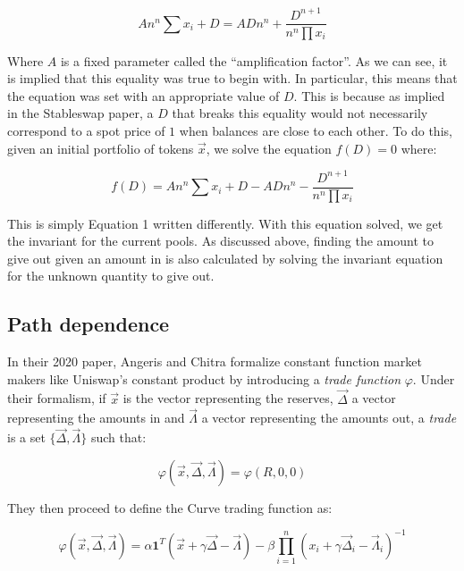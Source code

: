 \documentclass{article}
\begin{document}
    \begin{equation}
        A n^{n} \sum x_{i}+D=A D n^{n}+\frac{D^{n+1}}{n^{n} \prod x_{i}}
    \end{equation}

    Where $A$ is a fixed parameter called the ``amplification factor''. As we can see, it is implied that this equality was true to begin with. In particular, this means that the equation was set with an appropriate value of $D$. This is because as implied in the Stableswap paper, a $D$ that breaks this equality would not necessarily correspond to a spot price of $1$ when balances are close to each other. To do this, given an initial portfolio of tokens $\vec{x}$, we solve the equation $f(D) = 0$ where: 

    \begin{equation}
        f(D) = A n^{n} \sum x_{i}+D - A D n^{n} -\frac{D^{n+1}}{n^{n} \prod x_{i}}
    \end{equation}

    This is simply Equation 1 written differently. With this equation solved, we get the invariant for the current pools. As discussed above, finding the amount to give out given an amount in is also calculated by solving the invariant equation for the unknown quantity to give out. 

    \subsection{Path dependence}

    In their 2020 paper, Angeris and Chitra formalize constant function market makers like Uniswap's constant product by introducing a \textit{trade function} $\varphi$. Under their formalism, if $\vec{x}$ is the vector representing the reserves, $\vec{\Delta}$ a vector representing the amounts in and $\vec{\Lambda}$ a vector representing the amounts out, a \textit{trade} is a set $\{\vec{\Delta}, \vec{\Lambda}\}$ such that:

    \begin{equation}
        \varphi(\vec{x}, \vec{\Delta}, \vec{\Lambda}) = \varphi(R, 0,0)
    \end{equation}

    They then proceed to define the Curve trading function as: 

    \begin{equation}
        \varphi(\vec{x}, \vec{\Delta}, \vec{\Lambda})=\alpha \mathbf{1}^{T}(\vec{x}+\gamma \vec{\Delta}-\vec{\Lambda})-\beta \prod_{i=1}^{n}\left(x_{i}+\gamma \vec{\Delta}_{i}-\vec{\Lambda}_{i}\right)^{-1}
    \end{equation}
\end{document}
